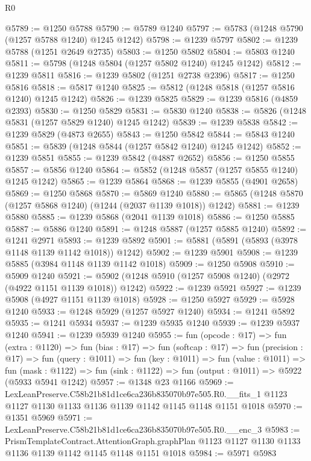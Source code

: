 \begin{lexlean}{R0}
\begin{coremodule}
@5789 := @1250 @5788
@5790 := @5789 @1240
@5797 := @5783 (@1248 @5790 (@1257 @5788 @1240) @1245 @1242)
@5798 := @1239 @5797
@5802 := @1239 @5788 (@1251 @2649 @2735)
@5803 := @1250 @5802
@5804 := @5803 @1240
@5811 := @5798 (@1248 @5804 (@1257 @5802 @1240) @1245 @1242)
@5812 := @1239 @5811
@5816 := @1239 @5802 (@1251 @2738 @2396)
@5817 := @1250 @5816
@5818 := @5817 @1240
@5825 := @5812 (@1248 @5818 (@1257 @5816 @1240) @1245 @1242)
@5826 := @1239 @5825
@5829 := @1239 @5816 (@4859 @2393)
@5830 := @1250 @5829
@5831 := @5830 @1240
@5838 := @5826 (@1248 @5831 (@1257 @5829 @1240) @1245 @1242)
@5839 := @1239 @5838
@5842 := @1239 @5829 (@4873 @2655)
@5843 := @1250 @5842
@5844 := @5843 @1240
@5851 := @5839 (@1248 @5844 (@1257 @5842 @1240) @1245 @1242)
@5852 := @1239 @5851
@5855 := @1239 @5842 (@4887 @2652)
@5856 := @1250 @5855
@5857 := @5856 @1240
@5864 := @5852 (@1248 @5857 (@1257 @5855 @1240) @1245 @1242)
@5865 := @1239 @5864
@5868 := @1239 @5855 (@4901 @2658)
@5869 := @1250 @5868
@5870 := @5869 @1240
@5880 := @5865 (@1248 @5870 (@1257 @5868 @1240) (@1244 (@2037 @1139 @1018)) @1242)
@5881 := @1239 @5880
@5885 := @1239 @5868 (@2041 @1139 @1018)
@5886 := @1250 @5885
@5887 := @5886 @1240
@5891 := @1248 @5887 (@1257 @5885 @1240)
@5892 := @1241 @2971
@5893 := @1239 @5892
@5901 := @5881 (@5891 (@5893 (@3978 @1148 @1139 @1142 @1018)) @1242)
@5902 := @1239 @5901
@5908 := @1239 @5885 (@3984 @1148 @1139 @1142 @1018)
@5909 := @1250 @5908
@5910 := @5909 @1240
@5921 := @5902 (@1248 @5910 (@1257 @5908 @1240) (@2972 (@4922 @1151 @1139 @1018)) @1242)
@5922 := @1239 @5921
@5927 := @1239 @5908 (@4927 @1151 @1139 @1018)
@5928 := @1250 @5927
@5929 := @5928 @1240
@5933 := @1248 @5929 (@1257 @5927 @1240)
@5934 := @1241 @5892
@5935 := @1241 @5934
@5937 := @1239 @5935 @1240
@5939 := @1239 @5937 @1240
@5941 := @1239 @5939 @1240
@5955 := fun (opcode : @17) =>
  fun (extra : @1120) =>
  fun (bias : @17) =>
  fun (softcap : @17) =>
  fun (precision : @17) =>
  fun (query : @1011) =>
  fun (key : @1011) =>
  fun (value : @1011) =>
  fun (mask : @1122) => fun (sink : @1122) => fun (output : @1011) => @5922 (@5933 @5941 @1242)
@5957 := @1348 @23 @1166
@5969 := LexLeanPreserve.C58b21b81d1ce6ca236b835070b97e505.R0.__fits_1
    @1123
    @1127
    @1130
    @1133
    @1136
    @1139
    @1142
    @1145
    @1148
    @1151
    @1018
@5970 := @1351 @5969
@5971 := LexLeanPreserve.C58b21b81d1ce6ca236b835070b97e505.R0.__enc_3
@5983 := PrismTemplateContract.AttentionGraph.graphPlan
    @1123
    @1127
    @1130
    @1133
    @1136
    @1139
    @1142
    @1145
    @1148
    @1151
    @1018
@5984 := @5971 @5983

\end{coremodule}
\end{lexlean}
